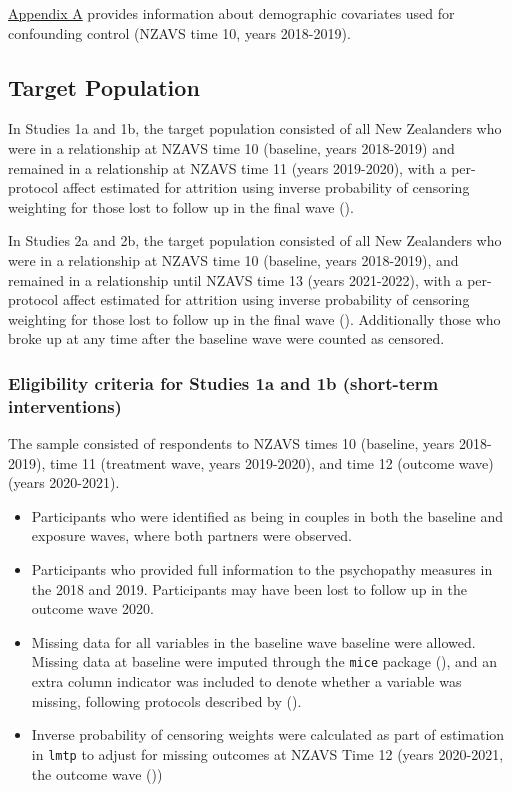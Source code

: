 \documentclass[
  singlecolumn]{article}
\providecommand{\tightlist}{%
  \setlength{\itemsep}{0pt}\setlength{\parskip}{0pt}}\usepackage{longtable,booktabs,array}
\begin{document}
\hyperref[appendix-demographics]{Appendix A} provides information about
demographic covariates used for confounding control (NZAVS time 10,
years 2018-2019).

\subsection{Target Population}\label{target-population}

In Studies 1a and 1b, the target population consisted of all New
Zealanders who were in a relationship at NZAVS time 10 (baseline, years
2018-2019) and remained in a relationship at NZAVS time 11 (years
2019-2020), with a per-protocol affect estimated for attrition using
inverse probability of censoring weighting for those lost to follow up
in the final wave ().

In Studies 2a and 2b, the target population consisted of all New
Zealanders who were in a relationship at NZAVS time 10 (baseline, years
2018-2019), and remained in a relationship until NZAVS time 13 (years
2021-2022), with a per-protocol affect estimated for attrition using
inverse probability of censoring weighting for those lost to follow up
in the final wave ().
Additionally those who broke up at any time after the baseline wave were
counted as censored.

\subsubsection{Eligibility criteria for Studies 1a and 1b (short-term
interventions)}\label{eligibility-criteria-for-studies-1a-and-1b-short-term-interventions}

The sample consisted of respondents to NZAVS times 10 (baseline, years
2018-2019), time 11 (treatment wave, years 2019-2020), and time 12
(outcome wave) (years 2020-2021).

\begin{itemize}
\tightlist
\item
  Participants who were identified as being in couples in both the
  baseline and exposure waves, where both partners were observed.\\
\item
  Participants who provided full information to the psychopathy measures
  in the 2018 and 2019. Participants may have been lost to follow up in
  the outcome wave 2020.
\item
  Missing data for all variables in the baseline wave baseline were
  allowed. Missing data at baseline were imputed through the
  \texttt{mice} package (),
  and an extra column indicator was included to denote whether a
  variable was missing, following protocols described by
  ().
\item
  Inverse probability of censoring weights were calculated as part of
  estimation in \texttt{lmtp} to adjust for missing outcomes at NZAVS
  Time 12 (years 2020-2021, the outcome wave
  ())
\end{itemize}
\end{document}
